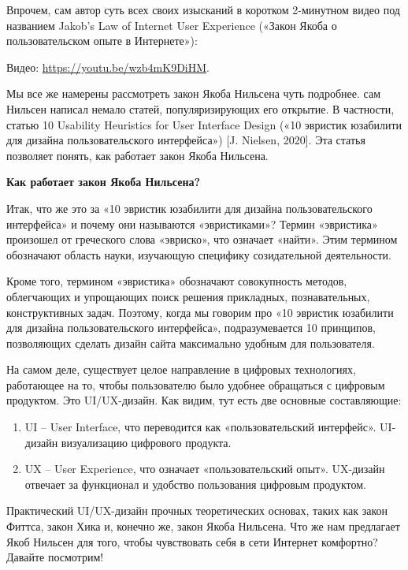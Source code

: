 Впрочем, сам автор  суть всех своих изысканий в коротком 2-минутном видео под названием Jakob’s Law of Internet User Experience («Закон Якоба о пользовательском опыте в Интернете»):

\begin{fancyquotes}
    Видео: \url{https://youtu.be/wzb4mK9DiHM}.
\end{fancyquotes}

Мы все же намерены рассмотреть закон Якоба Нильсена чуть подробнее.  сам Нильсен написал немало статей, популяризирующих его открытие. В частности, статью 10 Usability Heuristics for User Interface Design («10 эвристик юзабилити для дизайна пользовательского интерфейса») [J. Nielsen, 2020]. Эта статья позволяет понять, как работает закон Якоба Нильсена.

\textbf{Как работает закон Якоба Нильсена?}

Итак, что же это за «10 эвристик юзабилити для дизайна пользовательского интерфейса» и почему они называются «эвристиками»? Термин «эвристика» произошел от греческого слова «эвриско», что означает «найти». Этим термином обозначают область науки, изучающую специфику созидательной деятельности.

Кроме того, термином «эвристика» обозначают совокупность методов, облегчающих и упрощающих поиск решения прикладных, познавательных, конструктивных задач. Поэтому, когда мы говорим про «10 эвристик юзабилити для дизайна пользовательского интерфейса», подразумевается 10 принципов, позволяющих сделать дизайн сайта максимально удобным для пользователя.

На самом деле, существует целое направление в цифровых технологиях, работающее на то, чтобы пользователю было удобнее обращаться с цифровым продуктом. Это UI/UX-дизайн. Как видим, тут есть две основные составляющие:

\begin{enumerate}
    \item UI – User Interface, что переводится как «пользовательский интерфейс». UI-дизайн  визуализацию цифрового продукта.
    \item UX – User Experience, что означает «пользовательский опыт». UX-дизайн отвечает за функционал и удобство пользования цифровым продуктом.
\end{enumerate}

Практический UI/UX-дизайн  прочных теоретических основах, таких как закон Фиттса, закон Хика и, конечно же, закон Якоба Нильсена. Что же нам предлагает Якоб Нильсен для того, чтобы чувствовать себя в сети Интернет комфортно? Давайте посмотрим!

